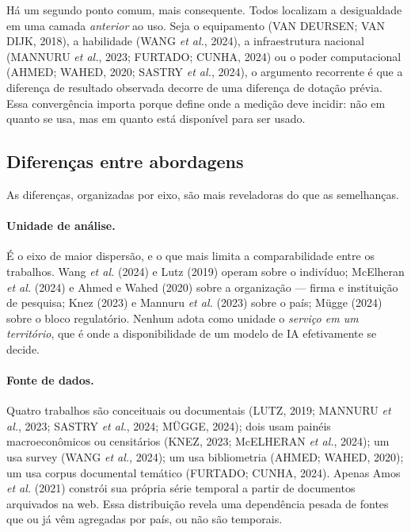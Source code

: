 \documentclass[12pt,a4paper]{article}
\begin{document}
Há um segundo ponto comum, mais consequente. Todos localizam a desigualdade em uma
camada \emph{anterior} ao uso. Seja o equipamento (VAN DEURSEN; VAN DIJK, 2018), a habilidade
(WANG \textit{et al.}, 2024), a infraestrutura nacional (MANNURU \textit{et al.}, 2023; FURTADO; CUNHA, 2024) ou o poder
computacional (AHMED; WAHED, 2020; SASTRY \textit{et al.}, 2024), o argumento recorrente é que a diferença de
resultado observada decorre de uma diferença de dotação prévia. Essa convergência
importa porque define onde a medição deve incidir: não em quanto se usa, mas em quanto
está disponível para ser usado.

\subsection{Diferenças entre abordagens}

As diferenças, organizadas por eixo, são mais reveladoras do que as semelhanças.

\paragraph{Unidade de análise.} É o eixo de maior dispersão, e o que mais limita a
comparabilidade entre os trabalhos. Wang \textit{et al.} (2024) e Lutz (2019) operam
sobre o indivíduo; McElheran \textit{et al.} (2024) e Ahmed e Wahed (2020) sobre a organização
--- firma e instituição de pesquisa; Knez (2023) e Mannuru \textit{et al.} (2023)
sobre o país; Mügge (2024) sobre o bloco regulatório. Nenhum adota como unidade
o \emph{serviço em um território}, que é onde a disponibilidade de um modelo de IA
efetivamente se decide.

\begin{sloppypar}
\paragraph{Fonte de dados.} Quatro trabalhos são conceituais ou documentais
(LUTZ, 2019; MANNURU \textit{et al.}, 2023; SASTRY \textit{et al.}, 2024; MÜGGE, 2024); dois usam painéis macroeconômicos ou
censitários (KNEZ, 2023; McELHERAN \textit{et al.}, 2024); um usa survey (WANG \textit{et al.}, 2024); um usa
bibliometria (AHMED; WAHED, 2020); um usa corpus documental temático (FURTADO; CUNHA, 2024).
Apenas Amos \textit{et al.} (2021) constrói sua própria série temporal a partir de documentos
arquivados na web. Essa distribuição revela uma dependência pesada de fontes que ou já
vêm agregadas por país, ou não são temporais.
\end{sloppypar}
\end{document}
